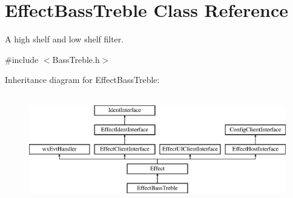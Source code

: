 \hypertarget{class_effect_bass_treble}{}\section{Effect\+Bass\+Treble Class Reference}
\label{class_effect_bass_treble}


A high shelf and low shelf filter.  




{\ttfamily \#include $<$Bass\+Treble.\+h$>$}

Inheritance diagram for Effect\+Bass\+Treble\+:\begin{figure}[H]
\begin{center}
\leavevmode
\includegraphics[height=4.794520cm]{class_effect_bass_treble}
\end{center}
\end{figure}
